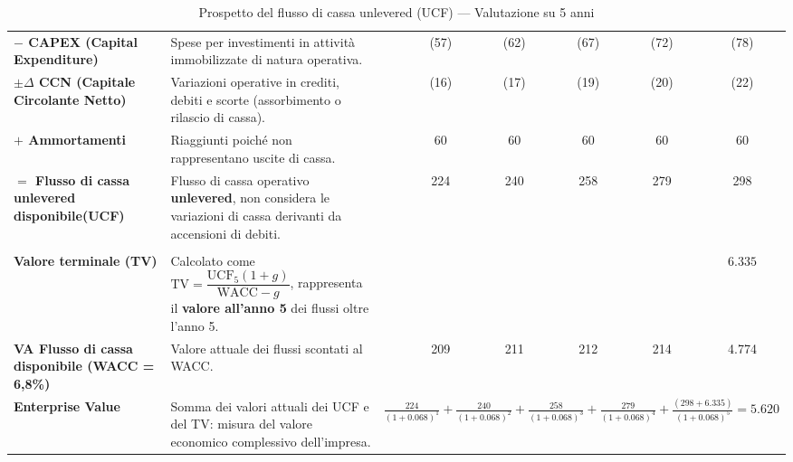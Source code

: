 \documentclass[a4paper,10pt]{article}
\begin{document}
\begin{table}[H]
{\begin{tabular}{|l|V{0.25\textwidth}|c|c|c|c|c|c|}
            \textbf{$-$ CAPEX (Capital Expenditure)} &
            \tiny Spese per investimenti in attività immobilizzate di natura operativa. &
             & (57) & (62) & (67) & (72) & (78) \\


            \textbf{$\pm \Delta$ CCN (Capitale Circolante Netto)} &
            \tiny Variazioni operative in crediti, debiti e scorte (assorbimento o rilascio di cassa). &
             & (16) & (17) & (19) & (20) & (22) \\


            \textbf{$+$ Ammortamenti} &
            \tiny Riaggiunti poiché non rappresentano uscite di cassa. &
             & 60 & 60 & 60 & 60 & 60 \\


            \textbf{$=$ Flusso di cassa unlevered disponibile(UCF)} &
            \tiny Flusso di cassa operativo \textbf{unlevered}, non considera le variazioni di cassa derivanti da accensioni di debiti. &
             & 224 & 240 & 258 & 279 & 298 \\
            \hline

             \\
            \hline

            \textbf{Valore terminale (TV)} &
            \tiny Calcolato come $\text{TV} = \dfrac{\text{UCF}_{5}(1+g)}{\text{WACC} - g}$, rappresenta il \textbf{valore all'anno 5} dei flussi oltre l’anno 5. & & & & & & $6.335$  \\
            \hline

            \textbf{VA Flusso di cassa disponibile (WACC = 6{,}8\%)} &
            \tiny Valore attuale dei flussi scontati al WACC. & 
             & 209 & 211 & 212 & 214 & 4.774 \\
            \hline

            \textbf{Enterprise Value} &
            \tiny Somma dei valori attuali dei UCF e del TV: misura del valore economico complessivo dell’impresa. & \\
            \hline
        \end{tabular}
    }
    \caption{Prospetto del flusso di cassa unlevered (UCF) — Valutazione su 5 anni}
\end{table}
\end{document}
